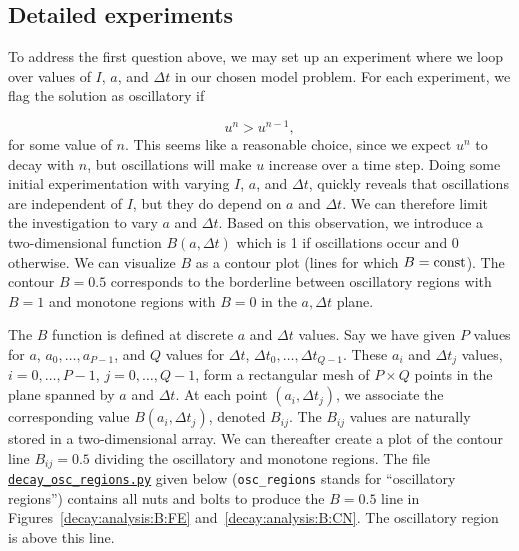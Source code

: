 \documentclass[graybox,sectrefs,envcountresetchap,open=right,final]{svmonodo}
\begin{document}
\subsection{Detailed experiments}

To address the first question above,
we may set up an experiment where we loop over values of $I$, $a$,
and $\Delta t$ in our chosen model problem.
For each experiment, we flag the solution as
oscillatory if

\[ u^{n} > u^{n-1},\]
for some value of $n$. This seems like a reasonable choice,
since we expect $u^n$ to decay with $n$, but oscillations will make
$u$ increase over a time step. Doing some initial experimentation
with varying $I$, $a$, and $\Delta t$, quickly reveals that
oscillations are independent of $I$, but they do depend on $a$ and
$\Delta t$. We can therefore limit the investigation to
vary $a$ and $\Delta t$. Based on this observation,
we introduce a two-dimensional
function $B(a,\Delta t)$ which is 1 if oscillations occur
and 0 otherwise. We can visualize $B$ as a contour plot
(lines for which $B=\hbox{const}$). The contour $B=0.5$
corresponds to the borderline between oscillatory regions with $B=1$
and monotone regions with $B=0$ in the $a,\Delta t$ plane.

The $B$ function is defined at discrete $a$ and $\Delta t$ values.
Say we have given $P$ values for $a$, $a_0,\ldots,a_{P-1}$, and
$Q$ values for $\Delta t$, $\Delta t_0,\ldots,\Delta t_{Q-1}$.
These $a_i$ and $\Delta t_j$ values, $i=0,\ldots,P-1$,
$j=0,\ldots,Q-1$, form a rectangular mesh of $P\times Q$ points
in the plane spanned by $a$ and $\Delta t$.
At each point $(a_i, \Delta t_j)$, we associate
the corresponding value $B(a_i,\Delta t_j)$, denoted $B_{ij}$.
The $B_{ij}$ values are naturally stored in a two-dimensional
array. We can thereafter create a plot of the
contour line $B_{ij}=0.5$ dividing the oscillatory and monotone
regions. The file \href{{http://tinyurl.com/ofkw6kc/analysis/decay_osc_regions.py}}{\nolinkurl{decay_osc_regions.py}}  given below (\Verb!osc_regions! stands for ``oscillatory regions'') contains all nuts and
bolts to produce the $B=0.5$ line in Figures~\ref{decay:analysis:B:FE}
and~\ref{decay:analysis:B:CN}. The oscillatory region is above this line.
\end{document}
